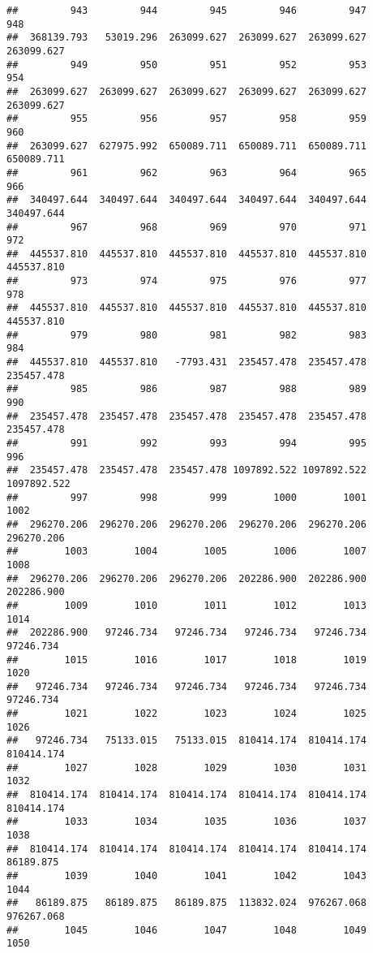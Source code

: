 \documentclass[
]{book}
\begin{document}
\begin{verbatim}
##         943         944         945         946         947         948 
##  368139.793   53019.296  263099.627  263099.627  263099.627  263099.627 
##         949         950         951         952         953         954 
##  263099.627  263099.627  263099.627  263099.627  263099.627  263099.627 
##         955         956         957         958         959         960 
##  263099.627  627975.992  650089.711  650089.711  650089.711  650089.711 
##         961         962         963         964         965         966 
##  340497.644  340497.644  340497.644  340497.644  340497.644  340497.644 
##         967         968         969         970         971         972 
##  445537.810  445537.810  445537.810  445537.810  445537.810  445537.810 
##         973         974         975         976         977         978 
##  445537.810  445537.810  445537.810  445537.810  445537.810  445537.810 
##         979         980         981         982         983         984 
##  445537.810  445537.810   -7793.431  235457.478  235457.478  235457.478 
##         985         986         987         988         989         990 
##  235457.478  235457.478  235457.478  235457.478  235457.478  235457.478 
##         991         992         993         994         995         996 
##  235457.478  235457.478  235457.478 1097892.522 1097892.522 1097892.522 
##         997         998         999        1000        1001        1002 
##  296270.206  296270.206  296270.206  296270.206  296270.206  296270.206 
##        1003        1004        1005        1006        1007        1008 
##  296270.206  296270.206  296270.206  202286.900  202286.900  202286.900 
##        1009        1010        1011        1012        1013        1014 
##  202286.900   97246.734   97246.734   97246.734   97246.734   97246.734 
##        1015        1016        1017        1018        1019        1020 
##   97246.734   97246.734   97246.734   97246.734   97246.734   97246.734 
##        1021        1022        1023        1024        1025        1026 
##   97246.734   75133.015   75133.015  810414.174  810414.174  810414.174 
##        1027        1028        1029        1030        1031        1032 
##  810414.174  810414.174  810414.174  810414.174  810414.174  810414.174 
##        1033        1034        1035        1036        1037        1038 
##  810414.174  810414.174  810414.174  810414.174  810414.174   86189.875 
##        1039        1040        1041        1042        1043        1044 
##   86189.875   86189.875   86189.875  113832.024  976267.068  976267.068 
##        1045        1046        1047        1048        1049        1050 

\end{verbatim}
\end{document}
